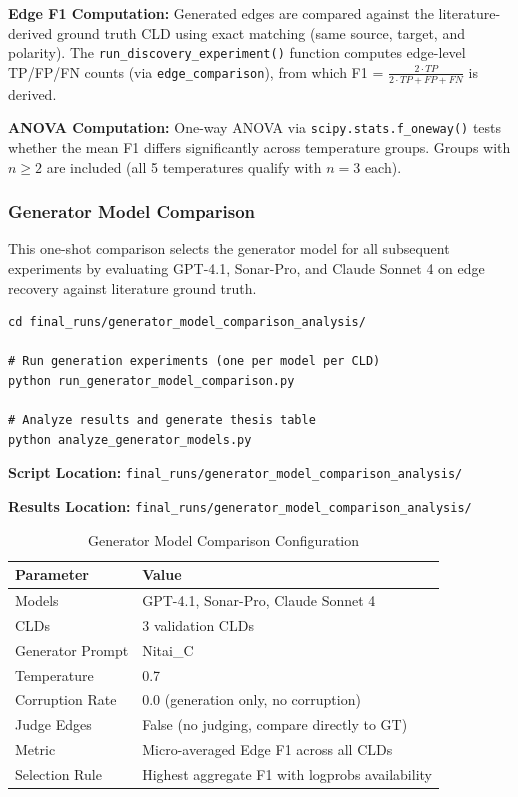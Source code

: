\textbf{Edge F1 Computation:} Generated edges are compared against the literature-derived ground truth CLD using exact matching (same source, target, and polarity). The \texttt{run\_discovery\_experiment()} function computes edge-level TP/FP/FN counts (via \texttt{edge\_comparison}), from which F1 = $\frac{2 \cdot TP}{2 \cdot TP + FP + FN}$ is derived.

\textbf{ANOVA Computation:} One-way ANOVA via \texttt{scipy.stats.f\_oneway()} tests whether the mean F1 differs significantly across temperature groups. Groups with $n \geq 2$ are included (all 5 temperatures qualify with $n=3$ each).

\subsubsection{Generator Model Comparison}
\label{sec:generator_comparison}

This one-shot comparison selects the generator model for all subsequent experiments by evaluating GPT-4.1, Sonar-Pro, and Claude Sonnet 4 on edge recovery against literature ground truth.

\begin{verbatim}
cd final_runs/generator_model_comparison_analysis/

# Run generation experiments (one per model per CLD)
python run_generator_model_comparison.py

# Analyze results and generate thesis table
python analyze_generator_models.py
\end{verbatim}

\textbf{Script Location:} \texttt{final\_runs/generator\_model\_comparison\_analysis/}

\textbf{Results Location:} \texttt{final\_runs/generator\_model\_comparison\_analysis/}

\begin{table}[H]
\centering
\caption{Generator Model Comparison Configuration}
\label{tab:generator_comparison_config}
\footnotesize
\begin{tabular}{@{}ll@{}}
\toprule
\textbf{Parameter} & \textbf{Value} \\
\midrule
Models & GPT-4.1, Sonar-Pro, Claude Sonnet 4 \\
CLDs & 3 validation CLDs \\
Generator Prompt & Nitai\_C \\
Temperature & 0.7 \\
Corruption Rate & 0.0 (generation only, no corruption) \\
Judge Edges & False (no judging, compare directly to GT) \\
\midrule
Metric & Micro-averaged Edge F1 across all CLDs \\
Selection Rule & Highest aggregate F1 with logprobs availability \\
\bottomrule
\end{tabular}
\end{table}

